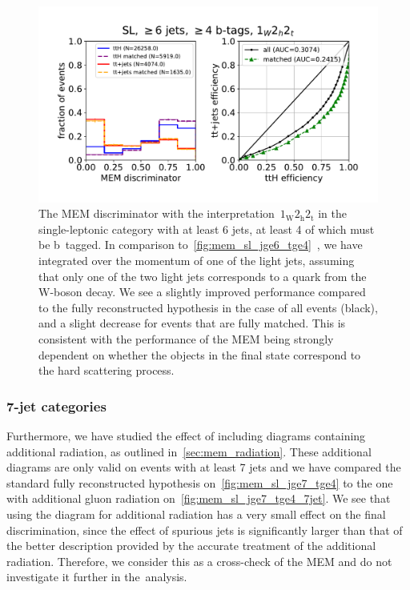 \begin{figure}
\begin{centering}
\includegraphics[width = 1.0\textwidth]{figures/mem_sl_jge6_tge4_1w2h2t.pdf}
\caption[The MEM discriminator with the~$1_{\mathrm{W}} 2_{\mathrm{h}} 2_{\mathrm{t}}$ interpretation in the $\ge6$ jet, $\ge4$ b-tag category.]{The MEM discriminator with the interpretation~$1_{\mathrm{W}} 2_{\mathrm{h}} 2_{\mathrm{t}}$ in the single-leptonic category with at least 6 jets, at least 4 of which must be b~tagged. In comparison to~\cref{fig:mem_sl_jge6_tge4}~, we have integrated over the momentum of one of the light jets, assuming that only one of the two light jets corresponds to a quark from the~$\mathrm{W}$-boson decay. We see a slightly improved performance compared to the fully reconstructed hypothesis in the case of all events (black), and a slight decrease for events that are fully matched. This is consistent with the performance of the MEM being strongly dependent on whether the objects in the final state correspond to the hard scattering process.}
\label{fig:mem_sl_jge6_tge4_1w2h2t}
\end{centering}
\end{figure}

\subsubsection{7-jet categories}
Furthermore, we have studied the effect of including diagrams containing additional radiation, as outlined in~\cref{sec:mem_radiation}. These additional diagrams are only valid on events with at least 7 jets and we have compared the standard fully reconstructed hypothesis on~\cref{fig:mem_sl_jge7_tge4} to the one with additional gluon radiation on~\cref{fig:mem_sl_jge7_tge4_7jet}. We see that using the diagram for additional radiation has a very small effect on the final discrimination, since the effect of spurious jets is significantly larger than that of the better description provided by the accurate treatment of the additional radiation. Therefore, we consider this as a cross-check of the MEM and do not investigate it further in the~\ttHbb analysis.

